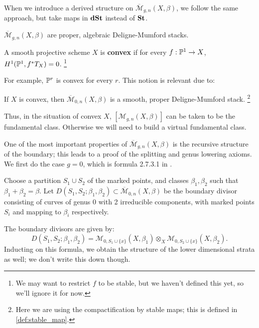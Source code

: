 \begin{rem}
When we introduce a derived structure on $\overline{\mathcal{M}}_{g,n}(X, \beta)$, we follow the same approach, but take
maps in $\mathbf{dSt}$ instead of $\mathbf{St}$.
\end{rem}

\begin{thm}
$\overline{\mathcal{M}}_{g,n}(X,\beta)$ are proper, algebraic Deligne-Mumford stacks.
\end{thm}

\begin{defin}
A smooth projective scheme $X$ is \textbf{convex} if for every $f:\mathbb P^1 \to X$, $H^1(\mathbb P^1, f^*T_X) = 0$.
\footnote{We may want to restrict $f$ to be stable, but we haven't defined this yet, so we'll ignore it for now.}
\end{defin}

For example, $\mathbb P^r$ is convex for every $r$. This notion is relevant due to:

\begin{prop}
If $X$ is convex, then $\overline{\mathcal{M}}_{0,n}(X,\beta)$ is a smooth, proper Deligne-Mumford stack.
\footnote{Here we are using the compactification by stable maps; this is defined in \ref{def:stable_map}.}
\end{prop}

Thus, in the situation of convex $X$, $[\mathcal{M}_{g,n}(X,\beta)]$ can be taken to be the fundamental class. Otherwise we will
need to build a virtual fundamental class.

One of the most important properties of $\overline{\mathcal{M}}_{g,n}(X,\beta)$ is the recursive structure of the boundary;
this leads to a proof of the splitting and genus lowering axioms. We first do the case $g=0$, which is formula
2.7.3.1 in \cite{invitation}.

Choose a partition $S_1 \cup S_2$ of the marked points, and classes $\beta_1, \beta_2$ such that $\beta_1 + \beta_2 = \beta$.
Let $D(S_1,S_2;\beta_1, \beta_2) \subset \overline{\mathcal{M}}_{0,n}(X,\beta)$ be the boundary divisor consisting of
curves of genus 0 with 2 irreducible components, with marked points $S_i$ and mapping to $\beta_i$ respectively.

\begin{lem}
\label{lem:recursive_structure}
The boundary divisors are given by:
\[	D(S_1,S_2;\beta_1, \beta_2) =  \mathcal{M}_{0,S_1\cup\{x\}}(X,\beta_1) \otimes_{X}  \mathcal{M}_{0,S_2\cup\{x\}}(X,\beta_2).	\]
Inducting on this formula, we obtain the structure of the lower dimensional strata as well; we don't write this down though.
\end{lem}

